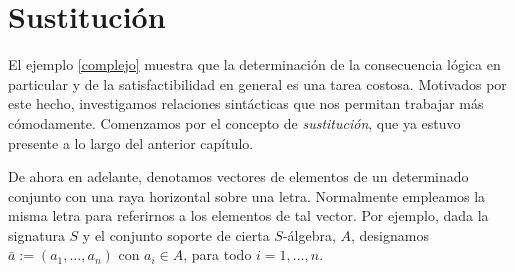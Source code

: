 \section{Sustitución}

El ejemplo \ref{complejo} muestra que la determinación de la consecuencia lógica en particular y de la satisfactibilidad en general es una tarea costosa. Motivados por este hecho, investigamos relaciones sintácticas que nos permitan trabajar más cómodamente. Comenzamos por el concepto de \textit{sustitución}, que ya estuvo presente a lo largo del anterior capítulo. 

De ahora en adelante, denotamos vectores de elementos de un determinado conjunto con una raya horizontal sobre una letra. Normalmente empleamos la misma letra para referirnos a los elementos de tal vector. Por ejemplo, dada la signatura $S$ y el conjunto soporte de cierta $S$-álgebra, $A$, designamos $\bar{a} := (a_1, \dots, a_n)$ con $a_i \in A$, para todo $i =1, \dots, n$.\\

